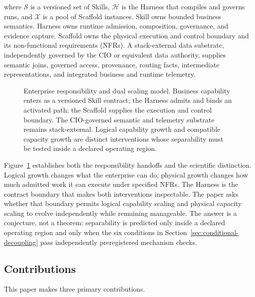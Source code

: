 where $\mathcal{S}$ is a versioned set of Skills, $\mathcal{H}$ is the Harness that compiles and governs runs, and $\mathcal{X}$ is a pool of Scaffold instances. Skill owns bounded business semantics. Harness owns runtime admission, composition, governance, and evidence capture. Scaffold owns the physical execution and control boundary and its non-functional requirements (NFRs). A stack-external data substrate, independently governed by the CIO or equivalent data authority, supplies semantic joins, governed access, provenance, routing facts, intermediate representations, and integrated business and runtime telemetry.

\begin{figure}[t]
\centering
\caption{Enterprise responsibility and dual scaling model. Business capability enters as a versioned Skill contract; the Harness admits and binds an activated path; the Scaffold supplies the execution and control boundary. The CIO-governed semantic and telemetry substrate remains stack-external. Logical capability growth and compatible capacity growth are distinct interventions whose separability must be tested inside a declared operating region.}
\label{fig:dual-scaling}
\end{figure}

Figure~\ref{fig:dual-scaling} establishes both the responsibility handoffs and the scientific distinction. Logical growth changes what the enterprise can do; physical growth changes how much admitted work it can execute under specified NFRs. The Harness is the contract boundary that makes both interventions inspectable. The paper asks whether that boundary permits logical capability scaling and physical capacity scaling to evolve independently while remaining manageable. The answer is a conjecture, not a theorem: separability is predicted only inside a declared operating region and only when the six conditions in Section~\ref{sec:conditional-decoupling} pass independently preregistered mechanism checks.

\subsection{Contributions}

This paper makes three primary contributions.

